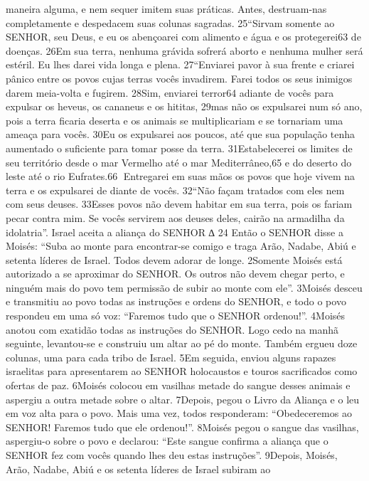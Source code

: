 maneira alguma, e nem sequer imitem suas práticas. Antes, destruam-nas
completamente e despedacem suas colunas sagradas.
   25“Sirvam somente ao SENHOR, seu Deus, e eu os abençoarei com alimento e
água e os protegerei63 de doenças. 26Em sua terra, nenhuma grávida sofrerá
aborto e nenhuma mulher será estéril. Eu lhes darei vida longa e plena.
   27“Enviarei pavor à sua frente e criarei pânico entre os povos cujas terras vocês
invadirem. Farei todos os seus inimigos darem meia-volta e fugirem. 28Sim,
enviarei terror64 adiante de vocês para expulsar os heveus, os cananeus e os
hititas, 29mas não os expulsarei num só ano, pois a terra ficaria deserta e os
animais se multiplicariam e se tornariam uma ameaça para vocês. 30Eu os
expulsarei aos poucos, até que sua população tenha aumentado o suficiente para
tomar posse da terra. 31Estabelecerei os limites de seu território desde o mar
Vermelho até o mar Mediterrâneo,65 e do deserto do leste até o rio Eufrates.66
Entregarei em suas mãos os povos que hoje vivem na terra e os expulsarei de
diante de vocês.
  32“Não façam tratados com eles nem com seus deuses. 33Esses povos não
devem habitar em sua terra, pois os fariam pecar contra mim. Se vocês servirem
aos deuses deles, cairão na armadilha da idolatria”.
Israel aceita a aliança do SENHOR
∆   24 Então o SENHOR disse a Moisés: “Suba ao monte para encontrar-se comigo
e traga Arão, Nadabe, Abiú e setenta líderes de Israel. Todos devem adorar de
longe. 2Somente Moisés está autorizado a se aproximar do SENHOR. Os outros não
devem chegar perto, e ninguém mais do povo tem permissão de subir ao monte
com ele”.
   3Moisés desceu e transmitiu ao povo todas as instruções e ordens do SENHOR, e
todo o povo respondeu em uma só voz: “Faremos tudo que o SENHOR ordenou!”.
   4Moisés anotou com exatidão todas as instruções do SENHOR. Logo cedo na
manhã seguinte, levantou-se e construiu um altar ao pé do monte. Também
ergueu doze colunas, uma para cada tribo de Israel. 5Em seguida, enviou alguns
rapazes israelitas para apresentarem ao SENHOR holocaustos e touros sacrificados
como ofertas de paz. 6Moisés colocou em vasilhas metade do sangue desses
animais e aspergiu a outra metade sobre o altar.
   7Depois, pegou o Livro da Aliança e o leu em voz alta para o povo. Mais uma vez,
todos responderam: “Obedeceremos ao SENHOR! Faremos tudo que ele ordenou!”.
   8Moisés pegou o sangue das vasilhas, aspergiu-o sobre o povo e declarou: “Este
sangue confirma a aliança que o SENHOR fez com vocês quando lhes deu estas
instruções”.
   9Depois, Moisés, Arão, Nadabe, Abiú e os setenta líderes de Israel subiram ao
